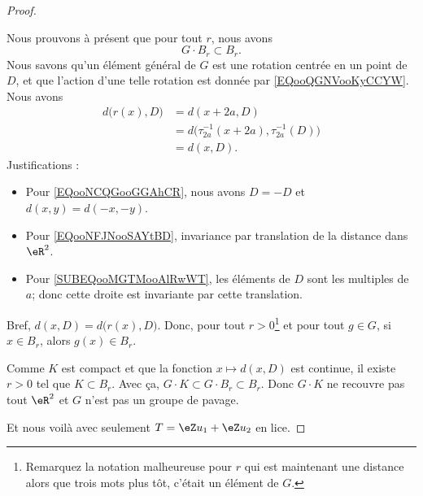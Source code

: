 \begin{proof}
\begin{subproof}
\begin{subproof}
			Nous prouvons à présent que pour tout \( r\), nous avons
			\begin{equation}
				G\cdot B_r \subset B_r.
			\end{equation}
			Nous savons qu'un élément général de \( G\) est une rotation centrée en un point de \( D\), et que l'action d'une telle rotation est donnée par \eqref{EQooQGNVooKyCCYW}. Nous avons
			\begin{subequations}
				\begin{align}
					d\big( r(x),D \big) & =d(x+2a,D)      \label{EQooNCQGooGGAhCR}                                        \\
					                    & =d\big( \tau_{2a}^{-1}(x+2a),\tau_{2a}^{-1}(D) \big)   \label{EQooNFJNooSAYtBD} \\
					                    & =d(x,D)        \label{SUBEQooMGTMooAlRwWT}.
				\end{align}
			\end{subequations}
			Justifications :
			\begin{itemize}
				\item Pour \eqref{EQooNCQGooGGAhCR}, nous avons \( D=-D\) et \(d(x,y)=d(-x,-y) \).
				\item Pour \eqref{EQooNFJNooSAYtBD}, invariance par translation de la distance dans \( \eR^2\).
				\item Pour \eqref{SUBEQooMGTMooAlRwWT}, les éléments de \( D\) sont les multiples de \( a\); donc cette droite est invariante par cette translation.
			\end{itemize}
			Bref, \( d(x,D)=d\big( r(x),D \big) \). Donc, pour tout \( r>0\)\footnote{Remarquez la notation malheureuse pour \( r\) qui est maintenant une distance alors que trois mots plus tôt, c'était un élément de \( G\).} et pour tout \( g\in G\), si \( x\in B_r\), alors \( g(x)\in B_r\).

			\spitem[Exclusion]

			Comme \( K\) est compact et que la fonction \( x\mapsto d(x,D)\) est continue, il existe \( r>0\) tel que \( K\subset B_r\). Avec ça, \( G\cdot K\subset G\cdot B_r\subset B_r\). Donc \( G\cdot K\) ne recouvre pas tout \( \eR^2\) et \( G\) n'est pas un groupe de pavage.
		\end{subproof}
	\end{subproof}

	Et nous voilà avec seulement \( T=\eZ u_1+\eZ u_2\) en lice.


\end{proof}
